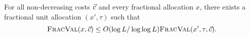 \begin{lemma}
    \label{lem:arbit-cost}
    For all non-decreasing costs $\vec{c}$ and every fractional allocation $x$,
    there exists a fractional unit allocation $(x',\tau)$ such that
    \[
        {\normalfont\textsc{FracVal}}(x,\vec{c})\le  O(\log L/\log\log L){\normalfont\textsc{FracVal}}(x',\tau,\vec{c}).
    \]
\end{lemma}




